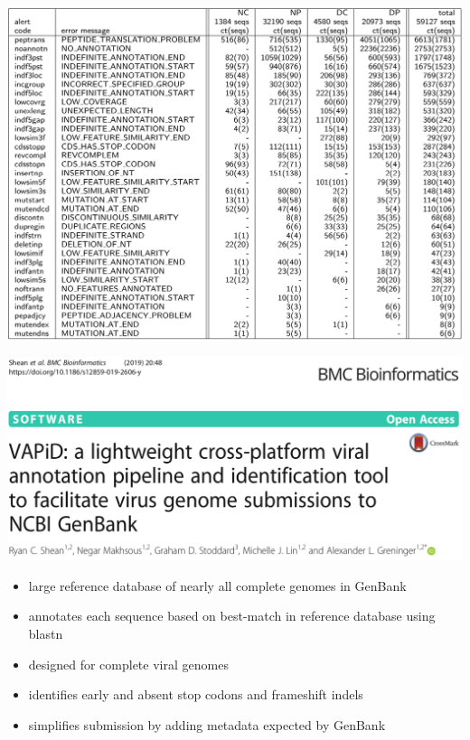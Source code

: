\documentclass[landscape]{slides}
\begin{document}
\begin{slide}
\begin{center}
\includegraphics[width=10.5in]{figs/ss-alert-counts}
\end{center}

\vfill
\end{slide}
\begin{slide}
\begin{center}
\includegraphics[width=10.5in]{figs/ss-vapid-title}
\end{center}

\small
\begin{itemize}
\item large reference database of nearly all complete genomes in
  GenBank
\item annotates each sequence based on best-match in reference
  database using blastn
\item designed for complete viral genomes
\item identifies early and absent stop codons and frameshift indels
\item simplifies submission by adding metadata expected by GenBank
\end{itemize}

\vfill
\end{slide}
\end{document}
